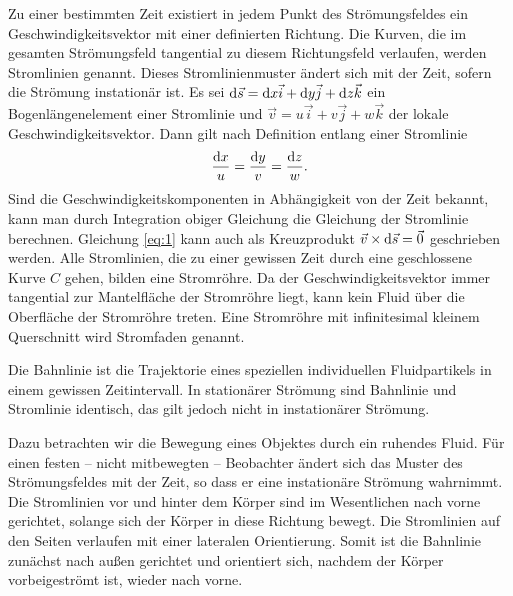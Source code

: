 \documentclass{lecture}
\begin{document}
    Zu einer bestimmten Zeit existiert in jedem Punkt des Strömungsfeldes ein Geschwindigkeitsvektor mit einer definierten Richtung.
    Die Kurven, die im gesamten Strömungsfeld tangential zu diesem Richtungsfeld verlaufen, werden Stromlinien genannt.
    Dieses Stromlinienmuster ändert sich mit der Zeit, sofern die Strömung instationär ist.
    Es sei \(\mathop{\mathrm{d}\!}\vec{s} = \mathop{\mathrm{d}\!} x\vec{i} + \mathop{\mathrm{d}\!} y\vec{j} + \mathop{\mathrm{d}\!} z\vec{k}\) ein Bogenlängenelement einer Stromlinie und \(\vec{v} = u\vec{i} + v\vec{j} + w\vec{k}\) der lokale Geschwindigkeitsvektor.
    Dann gilt nach Definition entlang einer Stromlinie
    \begin{equation}\label{eq:1}
        \frac{\mathop{\mathrm{d}\!} x}{u} = \frac{\mathop{\mathrm{d}\!} y}{v} = \frac{\mathop{\mathrm{d}\!} z}{w}.
    \end{equation}
    Sind die Geschwindigkeitskomponenten in Abhängigkeit von der Zeit bekannt, kann man durch Integration obiger Gleichung die Gleichung der Stromlinie berechnen.
    Gleichung \eqref{eq:1} kann auch als Kreuzprodukt \(\vec{v} \times \mathop{\mathrm{d}\!}\vec{s} = \vec{0}\) geschrieben werden.
    Alle Stromlinien, die zu einer gewissen Zeit durch eine geschlossene Kurve \(C\) gehen, bilden eine Stromröhre.
    Da der Geschwindigkeitsvektor immer tangential zur Mantelfläche der Stromröhre liegt, kann kein Fluid über die Oberfläche der Stromröhre treten.
    Eine Stromröhre mit infinitesimal kleinem Querschnitt wird Stromfaden genannt.

    Die Bahnlinie ist die Trajektorie eines speziellen individuellen Fluidpartikels in einem gewissen Zeitintervall.
    In stationärer Strömung sind Bahnlinie und Stromlinie identisch, das gilt jedoch nicht in instationärer Strömung.

    Dazu betrachten wir die Bewegung eines Objektes durch ein ruhendes Fluid.
    Für einen festen -- nicht mitbewegten -- Beobachter ändert sich das Muster des Strömungsfeldes mit der Zeit, so dass er eine instationäre Strömung wahrnimmt.
    Die Stromlinien vor und hinter dem Körper sind im Wesentlichen nach vorne gerichtet, solange sich der Körper in diese Richtung bewegt.
    Die Stromlinien auf den Seiten verlaufen mit einer lateralen Orientierung.
    Somit ist die Bahnlinie zunächst nach außen gerichtet und orientiert sich, nachdem der Körper vorbeigeströmt ist, wieder nach vorne.
\end{document}
